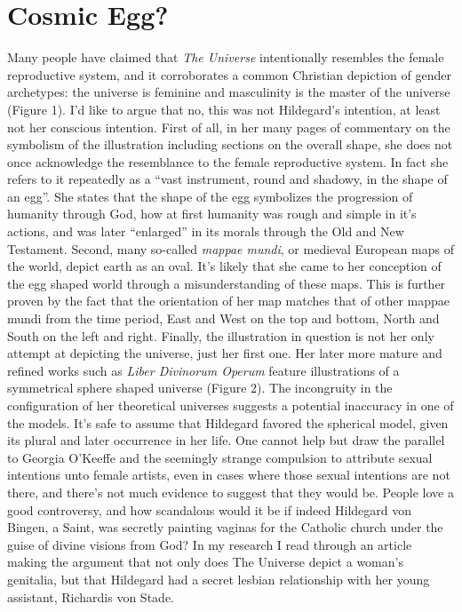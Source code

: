 \documentclass{turabian-researchpaper}
\begin{document}
\section{Cosmic Egg?}

    Many people have claimed that \emph{The Universe} intentionally resembles the female reproductive system, and it corroborates a common Christian depiction of gender archetypes: the universe is feminine and masculinity is the master of the universe (Figure 1).\autocite{scivias} I'd like to argue that no, this was not Hildegard's intention, at least not her conscious intention. First of all, in her many pages of commentary on the symbolism of the illustration including sections on the overall shape, she does not once acknowledge the resemblance to the female reproductive system. In fact she refers to it repeatedly as a ``vast instrument, round and shadowy, in the shape of an egg''.\autocite[94]{scivias} She states that the shape of the egg symbolizes the progression of humanity through God, how at first humanity was rough and simple in it's actions, and was later ``enlarged'' in its morals through the Old and New Testament. Second, many so-called \emph{mappae mundi}, or medieval European maps of the world, depict earth as an oval. It's likely that she came to her conception of the egg shaped world through a misunderstanding of these maps.\autocite[65]{singer} This is further proven by the fact that the orientation of her map matches that of other mappae mundi from the time period, East and West on the top and bottom, North and South on the left and right. Finally, the illustration in question is not her only attempt at depicting the universe, just her first one. Her later more mature and refined works such as \emph{Liber Divinorum Operum} feature illustrations of a symmetrical sphere shaped universe (Figure 2).\autocite{ISHVBS} The incongruity in the configuration of her theoretical universes suggests a potential inaccuracy in one of the models. It's safe to assume that Hildegard favored the spherical model, given its plural and later occurrence in her life.
    \linebreak[4]
    One cannot help but draw the parallel to Georgia O'Keeffe and the seemingly strange compulsion to attribute sexual intentions unto female artists, even in cases where those sexual intentions are not there, and there's not much evidence to suggest that they would be. People love a good controversy, and how scandalous would it be if indeed Hildegard von Bingen, a Saint, was secretly painting vaginas for the Catholic church under the guise of divine visions from God? In my research I read through an article making the argument that not only does The Universe depict a woman's genitalia, but that Hildegard had a secret lesbian relationship with her young assistant, Richardis von Stade.\autocite{nihil}
\end{document}
